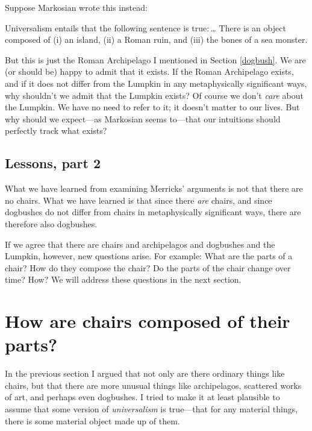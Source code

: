 \documentclass[12pt,twoside]{reedfancy}
\newenvironment{squote}{%
	\begin{spacing}{1}
	\begin{list}{}{%
	\setlength{\labelwidth}{0pt}%
	\rightmargin\leftmargin%
	}
	\item\relax
	}{%
	\end{list}%
	\end{spacing}
	}
\begin{document}
\begin{spacing}{1.25}
Suppose Markosian wrote this instead:

\begin{squote}
Universalism entails that the following sentence is true:\,\ldots
There is an object composed of (i) an island, (ii) a Roman ruin, and
(iii) the bones of a sea monster.
\end{squote}

But this is just the Roman Archipelago I mentioned in Section
\ref{dogbush}.  We are (or should be) happy to admit that it exists.
If the Roman Archipelago exists, and if it does not differ from the
Lumpkin in any metaphysically significant ways, why shouldn't we admit
that the Lumpkin exists?  Of course we don't {\em care} about the
Lumpkin.  We have no need to refer to it; it doesn't matter to our
lives.  But why should we expect---as Markosian seems to---that our
intuitions should perfectly track what exists?

\section{Lessons, part 2}
\label{lessons-m}
What we have learned from examining Merricks' arguments is not that
there are no chairs.  What we have learned is that since there {\em
  are} chairs, and since dogbushes do not differ from chairs in
metaphysically significant ways, there are therefore also dogbushes.

If we agree that there are chairs and archipelagos and dogbushes and
the Lumpkin, however, new questions arise. For example: What are the
parts of a chair?  How do they compose the chair?  Do the parts of the
chair change over time?  How?  We will address these questions in the
next section.  


\chapter{How are chairs composed of their parts?}
\label{parts}

In the previous section I argued that not only are there ordinary
things like chairs, but that there are more unusual things like
archipelagos, scattered works of art, and perhaps even dogbushes.  I
tried to make it at least plausible to assume that some version of
{\em universalism} is true---that for any material things, there is
some material object made up of them.


\end{spacing}
\end{document}
